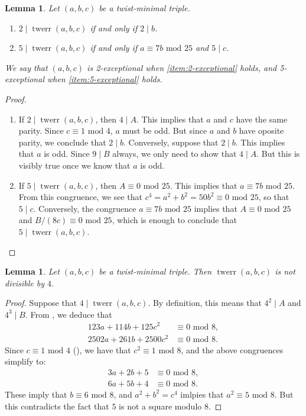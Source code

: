 \documentclass[12pt]{amsart}
\newcounter{counter}[section] %
\numberwithin{equation}{section} %
\newtheorem{lemma}[counter]{Lemma}
\theoremstyle{definition} \newtheorem{definition}[counter]{Definition}
\theoremstyle{remark} \newtheorem{nonexam}[counter]{Non-example}
\newcommand{\md}{\text{ mod }} %
\newcommand{\cdef}[1]{\textsf{#1}} %
\DeclareMathOperator{\twerr}{twerr} %
\begin{document}
\begin{lemma}
  \label{lemma:exceptional-triples}
  Let $(a,b,c)$ be a twist-minimal triple.
  \begin{enumerate}[label=(\alph*)]
  \item \label{item:2-exceptional} $2 \mid \twerr(a,b,c)$ if and only if
    $2 \mid b$.
  \item \label{item:5-exceptional} $5 \mid \twerr(a,b,c)$ if and only if
    $a \equiv 7b \md 25$ and $5 \mid c$.
  \end{enumerate}
  We say that $(a,b,c)$ is \cdef{2-exceptional} when \ref{item:2-exceptional}
  holds, and \cdef{5-exceptional} when \ref{item:5-exceptional} holds.
\end{lemma}
\begin{proof}
  \hfill
  \begin{enumerate}[label=(\alph*)]
  \item If $2 \mid \twerr(a,b,c)$, then $4 \mid A$. This implies that $a$ and
    $c$ have the same parity. Since $c \equiv 1 \md 4$, $a$ must be odd. But
    since $a$ and $b$ have oposite parity, we conclude that $2 \mid b$.
    Conversely, suppose that $2 \mid b$. This implies that $a$ is odd. Since $9
    \mid B$ always, we only need to show that $4 \mid A$. But this is visibly
    true once we know that $a$ is odd.
  \item If $5 \mid \twerr(a,b,c)$, then $A \equiv 0 \md 25$. This implies that
    $a \equiv 7b \md 25$. From this congruence, we see that $c^4 = a^2 +
    b^2 = 50b^2 \equiv 0 \md 25$, so that $5 \mid c$. Conversely, the
    congruence $a \equiv 7b \md 25$ implies that $A \equiv 0 \md 25$ and $B/(8c)
    \equiv 0 \md 25$, which is enough to conclude that $5 \mid \twerr(a,b,c)$.
  \end{enumerate}
\end{proof}

\begin{lemma}
  \label{lemma:4-nmid-twerr}
  Let $(a,b,c)$ be a twist-minimal triple. Then
  $\twerr(a,b,c)$ is not divisible by $4$.
\end{lemma}
\begin{proof}
  Suppose that $4 \mid \twerr(a,b,c)$. By definition, this means that $4^2 \mid
  A$ and $4^3 \mid B$. From , we deduce that
  \begin{align*}
    123a + 114b + 125c^2 &\equiv 0 \md 8, \\
    2502a + 261b + 2500c^2 &\equiv 0 \md 8.
  \end{align*}
  Since $c \equiv 1 \md 4$ (), we have that
  $c^2 \equiv 1 \md 8$, and the above congruences simplify to:
    \begin{align*}
    3a + 2b + 5 &\equiv 0 \md 8, \\
    6a + 5b + 4 &\equiv 0 \md 8.
    \end{align*}
    These imply that $b \equiv 6 \md 8$, and $a^2 + b^2 = c^4$ imlpies that
    $a^2 \equiv 5 \md 8$. But this contradicts the fact that $5$ is not a
    square modulo $8$.
\end{proof}
\end{document}

